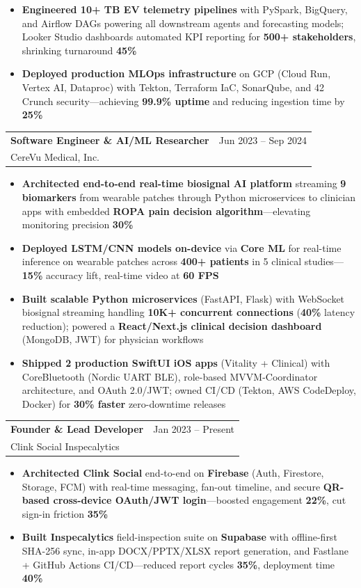 \documentclass[10.5pt,letterpaper]{article}
\makeatletter
\newcommand{\cventry}[5]{%
  \noindent\begin{tabularx}{\textwidth}{@{}X r@{}}
    {\bfseries\color{headerblue}#2} & {\color{graytext}#1} \\
    {\color{accentcolor}#3}\enskip{\color{lightgray}#4} & \\
  \end{tabularx}%
  \vspace{0.02em}%
  #5%
  \vspace{0.12em}%
}
\makeatother
\begin{document}
{\begin{itemize}[leftmargin=0.4cm, itemsep=0.02cm, topsep=0.04cm, label={\color{goldaccent}\textbullet}]
  \item \textbf{Engineered 10+ TB EV telemetry pipelines} with PySpark, BigQuery, and Airflow DAGs powering all downstream agents and forecasting models; Looker Studio dashboards automated KPI reporting for \textbf{500+ stakeholders}, shrinking turnaround \textbf{45\%}
  \item \textbf{Deployed production MLOps infrastructure} on GCP (Cloud Run, Vertex AI, Dataproc) with Tekton, Terraform IaC, SonarQube, and 42 Crunch security---achieving \textbf{99.9\% uptime} and reducing ingestion time by \textbf{25\%}
\end{itemize}
}

\cventry{Jun 2023 -- Sep 2024}{Software Engineer \& AI/ML Researcher}{CereVu Medical, Inc.}{San Francisco Bay Area, CA}{
\begin{itemize}[leftmargin=0.4cm, itemsep=0.02cm, topsep=0.04cm, label={\color{goldaccent}\textbullet}]
  \item \textbf{Architected end-to-end real-time biosignal AI platform} streaming \textbf{9 biomarkers} from wearable patches through Python microservices to clinician apps with embedded \textbf{ROPA pain decision algorithm}---elevating monitoring precision \textbf{30\%}
  \item \textbf{Deployed LSTM/CNN models on-device} via \textbf{Core ML} for real-time inference on wearable patches across \textbf{400+ patients} in 5 clinical studies---\textbf{15\%} accuracy lift, real-time video at \textbf{60 FPS}
  \item \textbf{Built scalable Python microservices} (FastAPI, Flask) with WebSocket biosignal streaming handling \textbf{10K+ concurrent connections} (\textbf{40\%} latency reduction); powered a \textbf{React/Next.js clinical decision dashboard} (MongoDB, JWT) for physician workflows
  \item \textbf{Shipped 2 production SwiftUI iOS apps} (Vitality + Clinical) with CoreBluetooth (Nordic UART BLE), role-based MVVM-Coordinator architecture, and OAuth 2.0/JWT; owned CI/CD (Tekton, AWS CodeDeploy, Docker) for \textbf{30\% faster} zero-downtime releases
\end{itemize}
}

\cventry{Jan 2023 -- Present}{Founder \& Lead Developer}{Clink Social \enspace\textbar\enspace Inspecalytics}{McKinney, TX}{
\begin{itemize}[leftmargin=0.4cm, itemsep=0.02cm, topsep=0.04cm, label={\color{goldaccent}\textbullet}]
  \item \textbf{Architected Clink Social} end-to-end on \textbf{Firebase} (Auth, Firestore, Storage, FCM) with real-time messaging, fan-out timeline, and secure \textbf{QR-based cross-device OAuth/JWT login}---boosted engagement \textbf{22\%}, cut sign-in friction \textbf{35\%}
  \item \textbf{Built Inspecalytics} field-inspection suite on \textbf{Supabase} with offline-first SHA-256 sync, in-app DOCX/PPTX/XLSX report generation, and Fastlane + GitHub Actions CI/CD---reduced report cycles \textbf{35\%}, deployment time \textbf{40\%}
\end{itemize}
}
\end{document}
